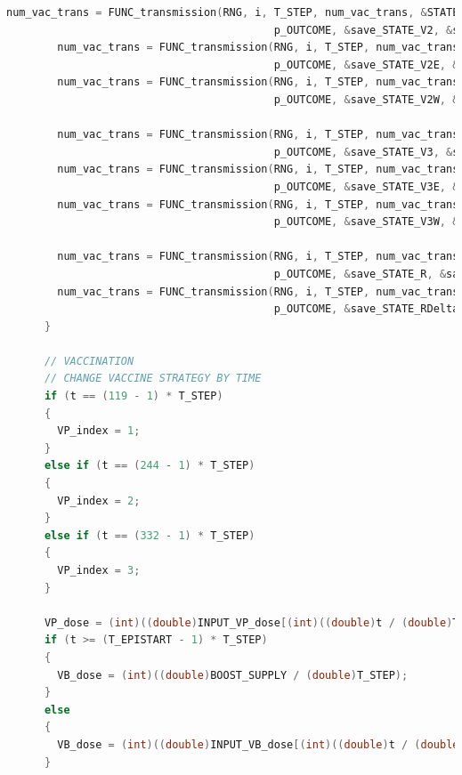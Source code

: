 \documentclass[bwprint]{gmcmthesis}
\numberwithin{figure}{section}
\begin{document}
\begin{lstlisting}[language=C]
        num_vac_trans = FUNC_transmission(RNG, i, T_STEP, num_vac_trans, &STATE_V2, VE_4_V2, 0, &STATE_R, p_Gamma,
                                          p_OUTCOME, &save_STATE_V2, &save_NEW_V2, Kappa, p_V2, rate4DRUG, 1, 0);
        num_vac_trans = FUNC_transmission(RNG, i, T_STEP, num_vac_trans, &STATE_V2E, VE_4_V2E, 0, &STATE_R, p_Gamma,
                                          p_OUTCOME, &save_STATE_V2E, &save_NEW_V2E, Kappa, p_V2E, rate4DRUG, 1, 0);
        num_vac_trans = FUNC_transmission(RNG, i, T_STEP, num_vac_trans, &STATE_V2W, VE_4_V2W, 0, &STATE_R, p_Gamma,
                                          p_OUTCOME, &save_STATE_V2W, &save_NEW_V2W, Kappa, p_V2W, rate4DRUG, BOOST_COVERAGE, 1);

        num_vac_trans = FUNC_transmission(RNG, i, T_STEP, num_vac_trans, &STATE_V3, VE_4_V3, 0, &STATE_R, p_Gamma,
                                          p_OUTCOME, &save_STATE_V3, &save_NEW_V3, Kappa, p_V3, rate4DRUG, 1, 0);
        num_vac_trans = FUNC_transmission(RNG, i, T_STEP, num_vac_trans, &STATE_V3E, VE_4_V3E, 0, &STATE_R, p_Gamma,
                                          p_OUTCOME, &save_STATE_V3E, &save_NEW_V3E, Kappa, p_V3E, rate4DRUG, 1, 0);
        num_vac_trans = FUNC_transmission(RNG, i, T_STEP, num_vac_trans, &STATE_V3W, VE_4_V3W, 0, &STATE_R, p_Gamma,
                                          p_OUTCOME, &save_STATE_V3W, &save_NEW_V3W, Kappa, p_V3W, rate4DRUG, 1, 0);

        num_vac_trans = FUNC_transmission(RNG, i, T_STEP, num_vac_trans, &STATE_R, VE_4_R, 0, &STATE_R, p_Gamma,
                                          p_OUTCOME, &save_STATE_R, &save_NEW_R, Kappa, p_R, rate4DRUG, 1, 0);
        num_vac_trans = FUNC_transmission(RNG, i, T_STEP, num_vac_trans, &STATE_RDelta, VE_4_RDelta, 0, &STATE_RDelta, p_Gamma,
                                          p_OUTCOME, &save_STATE_RDelta, &save_NEW_RDelta, Kappa, p_RDelta, rate4DRUG, 1, 0);
      }

      // VACCINATION
      // CHANGE VACCINE STRATEGY BY TIME
      if (t == (119 - 1) * T_STEP)
      {
        VP_index = 1;
      }
      else if (t == (244 - 1) * T_STEP)
      {
        VP_index = 2;
      }
      else if (t == (332 - 1) * T_STEP)
      {
        VP_index = 3;
      }

      VP_dose = (int)((double)INPUT_VP_dose[(int)((double)t / (double)T_STEP)] / (double)T_STEP);
      if (t >= (T_EPISTART - 1) * T_STEP)
      {
        VB_dose = (int)((double)BOOST_SUPPLY / (double)T_STEP);
      }
      else
      {
        VB_dose = (int)((double)INPUT_VB_dose[(int)((double)t / (double)T_STEP)] / (double)T_STEP);
      }


\end{lstlisting}
\end{document}

